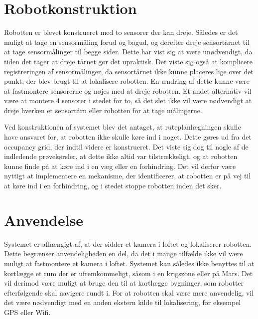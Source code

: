 \section{Robotkonstruktion}
Robotten er blevet konstrueret med to sensorer der kan dreje. 
Således er det muligt at tage en sensormåling forud og bagud, og derefter dreje sensortårnet til at tage sensormålinger til begge sider.
Dette har vist sig at være unødvendigt, da tiden det tager at dreje tårnet gør det upraktisk.
Det viste sig også at komplicere registreringen af sensormålinger, da sensortårnet ikke kunne placeres lige over det punkt, der blev brugt til at lokalisere robotten.
En ændring af dette kunne være at fastmontere sensorerne og nøjes med at dreje robotten.
Et andet alternativ vil være at montere 4 sensorer i stedet for to, så det slet ikke vil være nødvendigt at dreje hverken et sensortårn eller robotten for at tage målingerne.

Ved konstruktionen af systemet blev det antaget, at ruteplanlægningen skulle have ansvaret for, at robotten ikke skulle køre ind i noget. 
Dette gøres ud fra det occupancy grid, der indtil videre er konstrueret.
Det viste sig dog til nogle af de indledende prøvekørsler, at dette ikke altid var tilstrækkeligt, og at robotten kunne finde på at køre ind i en væg eller en forhindring.
Det vil derfor være nyttigt at implementere en mekanisme, der identificerer, at robotten er på vej til at køre ind i en forhindring, og i stedet stoppe robotten inden det sker. 

\section{Anvendelse}
Systemet er afhængigt af, at der sidder et kamera i loftet og lokaliserer robotten.
Dette begrænser anvendeligheden en del, da det i mange tilfælde ikke vil være muligt at fastmontere et kamera i loftet.
Systemet kan således ikke benyttes til at kortlægge et rum der er ufremkommeligt, såsom i en krigszone eller på Mars.
Det vil derimod være muligt at bruge den til at kortlægge bygninger, som robotter efterfølgende skal navigere rundt i.
For at robotten skal være mere anvendelig, vil det være nødvendigt med en anden ekstern kilde til lokalisering, for eksempel GPS eller Wifi.
